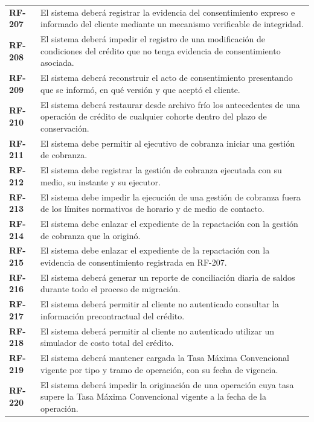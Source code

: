 \documentclass[11pt]{article}
\begin{document}
\begin{longtable}[]{@{}
  >{\raggedright\arraybackslash}p{}
  >{\raggedright\arraybackslash}p{}@{}}
\addlinespace[2pt]
\textbf{RF-207} & El sistema deberá registrar la evidencia del consentimiento expreso e informado del cliente mediante un mecanismo verificable de integridad. \\
\addlinespace[2pt]
\textbf{RF-208} & El sistema deberá impedir el registro de una modificación de condiciones del crédito que no tenga evidencia de consentimiento asociada. \\
\addlinespace[2pt]
\textbf{RF-209} & El sistema deberá reconstruir el acto de consentimiento presentando que se informó, en qué versión y que aceptó el cliente. \\
\addlinespace[2pt]
\textbf{RF-210} & El sistema deberá restaurar desde archivo frío los antecedentes de una operación de crédito de cualquier cohorte dentro del plazo de conservación. \\
\addlinespace[2pt]
\textbf{RF-211} & El sistema debe permitir al ejecutivo de cobranza iniciar una gestión de cobranza. \\
\addlinespace[2pt]
\textbf{RF-212} & El sistema debe registrar la gestión de cobranza ejecutada con su medio, su instante y su ejecutor. \\
\addlinespace[2pt]
\textbf{RF-213} & El sistema debe impedir la ejecución de una gestión de cobranza fuera de los límites normativos de horario y de medio de contacto. \\
\addlinespace[2pt]
\textbf{RF-214} & El sistema debe enlazar el expediente de la repactación con la gestión de cobranza que la originó. \\
\addlinespace[2pt]
\textbf{RF-215} & El sistema debe enlazar el expediente de la repactación con la evidencia de consentimiento registrada en RF-207. \\
\addlinespace[2pt]
\textbf{RF-216} & El sistema deberá generar un reporte de conciliación diaria de saldos durante todo el proceso de migración. \\
\addlinespace[2pt]
\textbf{RF-217} & El sistema deberá permitir al cliente no autenticado consultar la información precontractual del crédito. \\
\addlinespace[2pt]
\textbf{RF-218} & El sistema deberá permitir al cliente no autenticado utilizar un simulador de costo total del crédito. \\
\addlinespace[2pt]
\textbf{RF-219} & El sistema deberá mantener cargada la Tasa Máxima Convencional vigente por tipo y tramo de operación, con su fecha de vigencia. \\
\addlinespace[2pt]
\textbf{RF-220} & El sistema deberá impedir la originación de una operación cuya tasa supere la Tasa Máxima Convencional vigente a la fecha de la operación. \\

\end{longtable}
\end{document}
